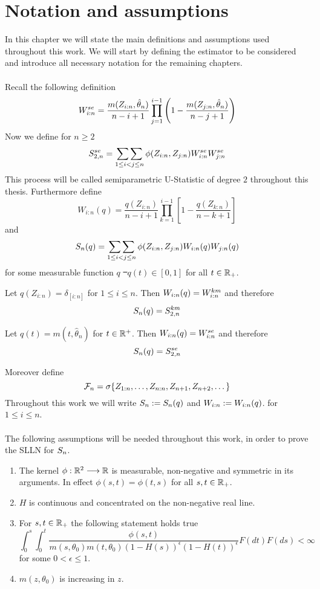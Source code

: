 \chapter{Notation and assumptions}
In this chapter we will state the main definitions and assumptions used throughout this work. We will start by defining the estimator to be considered and introduce all necessary notation for the remaining chapters.\\
\\
Recall the following definition
$$W_{i:n}^{se} = \frac{m(Z_{i:n}, \hat{\theta}_n)}{n-i+1} \prod\limits_{j=1}^{i-1}\left(1-\frac{m(Z_{j:n}, \hat{\theta}_n)}{n-j+1}\right)$$
%
Now we define for $n\geq2$
$$S_{2,n}^{se} = \mathop{\sum\sum}\limits_{1\leq i<j\leq n}\phi(Z_{i:n}, Z_{j:n})W_{i:n}^{se}W_{j:n}^{se}$$
This process will be called semiparametric U-Statistic of degree $2$ throughout this thesis.
%
Furthermore define
$$W_{i:n}(q) = \frac{q(Z_{i:n})}{n-i+1}\prod_{k=1}^{i-1}\left[1-\frac{q(Z_{k:n})}{n-k+1}\right]$$
and 
$$S_{n}(q) = \mathop{\sum\sum}\limits_{1\leq i<j\leq n}\phi(Z_{i:n}, Z_{j:n})W_{i:n}(q)W_{j:n}(q)$$
for some measurable function $q$ \st\ $q(t)\in[0,1]$ for all $t\in\mathbb{R}_+$.
%
\begin{example}
	Let $q(Z_{i:n}) = \delta_{[i:n]}$ for $1\leq i\leq n$. Then $W_{i:n}(q) = W_{i:n}^{km}$ and therefore 
	$$S_n(q) = S_{2,n}^{km}$$
\end{example}
%
\begin{example}
	Let $q(t) = m(t, \hat\theta_n)$ for $t\in\mathbb{R}^+$. Then $W_{i:n}(q) = W_{i:n}^{se}$ and therefore 
	$$S_n(q) = S_{2,n}^{se}$$
\end{example}
%
\noindent Moreover define
$$\mathcal{F}_n = \sigma\{Z_{1:n}, \dots, Z_{n:n}, Z_{n+1}, Z_{n+2}, \dots\}$$
%
Throughout this work we will write $S_{n} := S_{n}(q)$ and $W_{i:n} := W_{i:n}(q)$.
for $1\leq i\leq n$.\\
\\
%
The following assumptions will be needed throughout this work, in order to prove the SLLN for $S_{n}$.
\begin{enumerate}[({A}1)]
	\item \label{ass:kernel_gen} The kernel $\phi: \mathbb{R}^2 \longrightarrow \mathbb{R}$ is measurable, non-negative and symmetric in its arguments. In effect $\phi(s,t) = \phi(t,s)$ for all $s,t \in \mathbb{R}_+$. 
	\item \label{ass:H_nonneg} $H$ is continuous and concentrated on the non-negative real line.
	\item \label{ass:intgral_phi_q} For $s,t\in \mathbb{R}_+$ the following statement holds true
	$$\int_{0}^{s} \int_{0}^{t} \frac{\phi(s,t)}{m(s, \theta_0)m(t,\theta_0)(1-H(s))^\epsilon(1-H(t))^{\epsilon}} F(dt)F(ds) < \infty$$
	for some $0<\epsilon\leq 1$.
	\item \label{ass:m_increas} $m(z,\theta_0)$ is increasing in $z$.
\end{enumerate}
